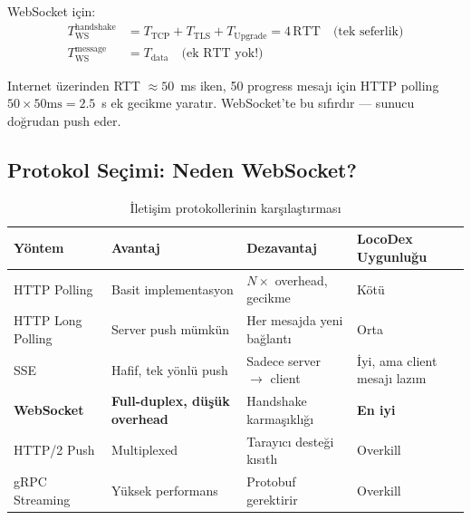 WebSocket i\c{c}in:
\begin{align}
\label{eq:ws-latency}
T_{\mathrm{WS}}^{\mathrm{handshake}} &= T_{\mathrm{TCP}} + T_{\mathrm{TLS}} + T_{\mathrm{Upgrade}} = 4\,\text{RTT} \quad \text{(tek seferlik)} \\
T_{\mathrm{WS}}^{\mathrm{message}}   &= T_{\mathrm{data}} \quad \text{(ek RTT yok!)}
\end{align}

\begin{dikkat}
Internet \"{u}zerinden RTT $\approx 50$~ms iken, 50 progress mesaj{\i} i\c{c}in HTTP polling $50 \times 50\text{ms} = 2{.}5$~s ek gecikme yarat{\i}r. WebSocket'te bu s{\i}f{\i}rd{\i}r --- sunucu do\u{g}rudan push eder.
\end{dikkat}


\subsection{Protokol Se\c{c}imi: Neden WebSocket?}
\label{sec:protocol-choice}

\begin{table}[H]
\centering
\caption{\.{I}leti\c{s}im protokollerinin kar\c{s}{\i}la\c{s}t{\i}rmas{\i}}
\label{tab:protocol-comparison}
\begin{tabularx}{\textwidth}{lXXX}
\toprule
\color{chapterBlue}\textbf{Y\"{o}ntem} & \color{chapterBlue}\textbf{Avantaj} & \color{chapterBlue}\textbf{Dezavantaj} & \color{chapterBlue}\textbf{LocoDex Uygunlu\u{g}u} \\
\midrule
HTTP Polling       & Basit implementasyon      & $N \times$ overhead, gecikme     & K\"{o}t\"{u} \\
HTTP Long Polling  & Server push m\"{u}mk\"{u}n        & Her mesajda yeni ba\u{g}lant{\i}  & Orta \\
SSE                & Hafif, tek y\"{o}nl\"{u} push    & Sadece server $\to$ client      & \.{I}yi, ama client mesaj{\i} laz{\i}m \\
\textbf{WebSocket} & \textbf{Full-duplex, d\"{u}\c{s}\"{u}k overhead} & Handshake karma\c{s}{\i}kl{\i}\u{g}{\i} & \textbf{En iyi} \\
HTTP/2 Push        & Multiplexed               & Taray{\i}c{\i} deste\u{g}i k{\i}s{\i}tl{\i}     & Overkill \\
gRPC Streaming     & Y\"{u}ksek performans          & Protobuf gerektirir             & Overkill \\
\bottomrule
\end{tabularx}
\end{table}


